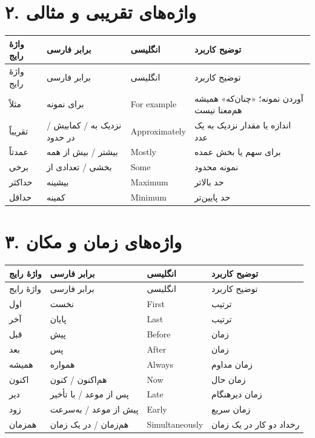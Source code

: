 \documentclass[a4paper,12pt,openany]{book}
\begin{document}
\section*{۲. واژه‌های تقریبی و مثالی}
\begingroup
\small
\setlength{\tabcolsep}{4pt}
\renewcommand{\arraystretch}{1.25}
\begin{longtable}{|p{2.5cm}|p{4.0cm}|p{2.3cm}|p{5.3cm}|}
\hline
واژهٔ رایج & برابر فارسی & انگلیسی & توضیح کاربرد \\
\hline
\endfirsthead
\hline
واژهٔ رایج & برابر فارسی & انگلیسی & توضیح کاربرد \\
\hline
\endhead
مثلاً & برای نمونه & \textenglish{For example} & آوردن نمونه؛ «چنان‌که» همیشه هم‌معنا نیست \\
تقریباً & نزدیک به / کمابیش / در حدود & \textenglish{Approximately} & اندازه یا مقدار نزدیک به یک عدد \\
عمدتاً & بیشتر / بیش از همه & \textenglish{Mostly} & برای سهم یا بخش عمده \\
برخی & بخشی / تعدادی از & \textenglish{Some} & نمونه محدود \\
حداکثر & بیشینه & \textenglish{Maximum} & حد بالاتر \\
حداقل & کمینه & \textenglish{Minimum} & حد پایین‌تر \\
\hline
\end{longtable}
\endgroup

\section*{۳. واژه‌های زمان و مکان}
\begingroup
\small
\setlength{\tabcolsep}{4pt}
\renewcommand{\arraystretch}{1.25}
\begin{longtable}{|p{2.5cm}|p{4.0cm}|p{2.3cm}|p{5.3cm}|}
\hline
واژهٔ رایج & برابر فارسی & انگلیسی & توضیح کاربرد \\
\hline
\endfirsthead
\hline
واژهٔ رایج & برابر فارسی & انگلیسی & توضیح کاربرد \\
\hline
\endhead
اول & نخست & \textenglish{First} & ترتیب \\
آخر & پایان & \textenglish{Last} & ترتیب \\
قبل & پیش & \textenglish{Before} & زمان \\
بعد & پس & \textenglish{After} & زمان \\
همیشه & همواره & \textenglish{Always} & زمان مداوم \\
اکنون & هم‌اکنون / کنون & \textenglish{Now} & زمان حال \\
دیر & پس از موعد / با تأخیر & \textenglish{Late} & زمان دیرهنگام \\
زود & پیش از موعد / به‌سرعت & \textenglish{Early} & زمان سریع \\
همزمان & هم‌زمان / در یک زمان & \textenglish{Simultaneously} & رخداد دو کار در یک زمان \\
\hline
\end{longtable}
\endgroup
\end{document}
